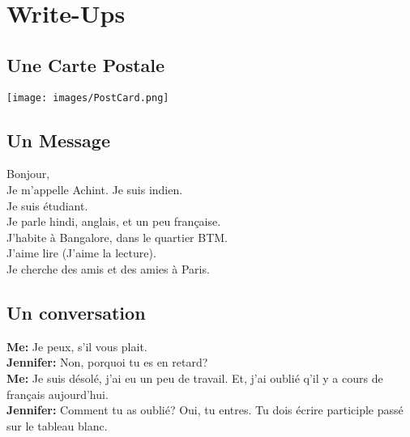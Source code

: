 \section{Write-Ups}

\subsection{Une Carte Postale}
\texttt{[image: images/PostCard.png]}

\subsection{Un Message}
Bonjour,\\
Je m'appelle Achint. Je suis indien.\\
Je suis \'etudiant. \\
Je parle hindi, anglais, et un peu fran\c{c}aise.\\
J'habite \`a Bangalore, dans le quartier BTM.\\
J'aime lire (J'aime la lecture).\\
Je cherche des amis et des amies \`a Paris.\\

\subsection{Un conversation}

\textbf{Me:} Je peux, s'il vous plait.\\
\textbf{Jennifer:} Non, porquoi tu es en retard?\\
\textbf{Me:} Je suis d\'esol\'e, j'ai eu un peu de travail. Et, j'ai oubli\'e q'il y a cours de fran\c{c}ais aujourd'hui.\\
\textbf{Jennifer:} Comment tu as oubli\'e? Oui, tu entres. Tu dois \'ecrire participle passé sur le tableau blanc.\\


